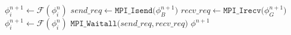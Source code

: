 \begin{algorithm}[htbp]
\caption{$\phi^{n+1} \gets \texttt{Overlap (}\phi^n, \mathcal{F}\texttt{)}$} %
\begin{algorithmic}[1]
 
	\State $\phi^{n+1}_i \gets \mathcal{F}(\phi_i^n)$
\EndFor
\State $send\_req \gets \texttt{MPI\_Isend(}\phi^{n+1}_B\texttt{)}$ 
\State $recv\_req \gets \texttt{MPI\_Irecv(}\phi^{n+1}_G\texttt{)}$
 
	\State $\phi^{n+1}_i \gets \mathcal{F}(\phi_i^n)$ 
\EndFor
\State $\texttt{MPI\_Waitall(}send\_req, recv\_req\texttt{)}$ 
\State \Return $\phi^{n+1}$
\end{algorithmic}
\label{alg:overlap}
\end{algorithm}